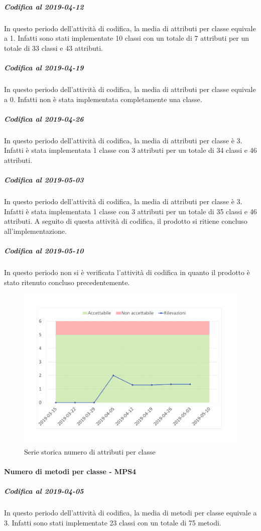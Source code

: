\subparagraph{Codifica al 2019-04-12}
In questo periodo dell'attività di codifica, la media di attributi per classe equivale a 1. Infatti sono stati implementate 10 classi con un totale di 7 attributi per un totale di 33 classi e 43 attributi.

\subparagraph{Codifica al 2019-04-19}
In questo periodo dell'attività di codifica, la media di attributi per classe equivale a 0. Infatti non è stata implementata completamente una classe.

\subparagraph{Codifica al 2019-04-26}
In questo periodo dell'attività di codifica, la media di attributi per classe è 3. Infatti è stata implementata 1 classe con 3 attributi per un totale di 34 classi e 46 attributi.

\subparagraph{Codifica al 2019-05-03}
In questo periodo dell'attività di codifica, la media di attributi per classe è 3. Infatti è stata implementata 1 classe con 3 attributi per un totale di 35 classi e 46 attributi.
A seguito di questa attività di codifica, il prodotto si ritiene concluso all'implementazione.

\subparagraph{Codifica al 2019-05-10}
In questo periodo non si è verificata l'attività di codifica in quanto il prodotto è stato ritenuto concluso precedentemente.

\begin{figure}[H]
	\centering
	\includegraphics[scale=0.6]{images/resoconto/MPS3Chart.pdf}
	\caption{Serie storica numero di attributi per classe}	
\end{figure}

\paragraph{Numero di metodi per classe - MPS4}
\subparagraph{Codifica al 2019-04-05}
In questo periodo dell'attività di codifica, la media di metodi per classe equivale a 3. Infatti sono stati implementate 23 classi con un totale di 75 metodi.

